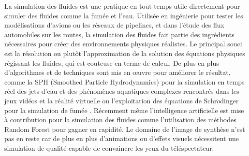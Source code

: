 \documentclass[11pt]{article}
\begin{document}
La simulation des fluides est une pratique en tout temps utile directement pour simuler des fluides comme la fumée et l'eau. Utilisée en ingénierie pour tester les modélisations d'avions ou les réseaux de pipelines, et dans l'étude des flux automobiles sur les routes, la simulation des fluides fait partie des ingrédients nécessaires pour créer des environnements physiques réalistes. Le principal souci est la résolution ou plutôt l'approximation de la solution des équations physiques régissant les fluides, qui est couteuse en terme de calcul. De plus en plus d'algorithmes et de techniques sont mis en \oe uvre pour améliorer le résultat, comme la SPH (Smoothed Particle Hydrodynamics) \cite{muller-2003} pour la simulation en temps réel des jets d'eau et des phénomènes aquatiques complexes rencontrés dans les jeux vidéos et la réalité virtuelle ou l'exploitation des équations de Schr$\ddot{o}$dinger pour la simulation de fumée \cite{chern-2016}. Récemment même l'intelligence artificielle est mise à contribution pour la simulation des fluides comme l'utilisation des méthodes Random Forest \cite{ladicky-2015} pour gagner en rapidité. Le domaine de l'image de synthèse n'est pas en reste car de plus en plus d'animations ou d'effets visuels nécessitent une simulation de qualité capable de convaincre les yeux du téléspectateur.
\end{document}
